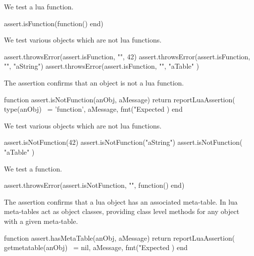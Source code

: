 
We test a lua function.

\startLuaTest
  assert.isFunction(function() end)
\stopLuaTest
\stopTestCase


We test various objects which are not lua functions.

\startLuaTest
  assert.throwsError(assert.isFunction, "", 42)
  assert.throwsError(assert.isFunction, "", "aString")
  assert.throwsError(assert.isFunction, "", { "aTable" })
\stopLuaTest
\stopTestCase

\stopTestSuite


The  assertion confirms that an object is not a 
lua function. 

\startLuaCode
function assert.isNotFunction(anObj, aMessage)
  return reportLuaAssertion(
    type(anObj) ~= 'function',
    aMessage,
    fmt("Expected %
  )
end
\stopLuaCode


We test various objects which are not lua functions.

\startLuaTest
  assert.isNotFunction(42)
  assert.isNotFunction("aString")
  assert.isNotFunction({ "aTable" })
\stopLuaTest
\stopTestCase


We test a function.

\startLuaTest
  assert.throwsError(assert.isNotFunction, "", function() end)
\stopLuaTest
\stopTestCase

\stopTestSuite


The  assertion confirms that a lua object has an 
associated meta-table. In lua meta-tables act as object classes, providing 
class level methods for any object with a given meta-table. 

\startLuaCode
function assert.hasMetaTable(anObj, aMessage)
  return reportLuaAssertion(
    getmetatable(anObj) ~= nil,
    aMessage,
    fmt("Expected %
  )
end
\stopLuaCode


